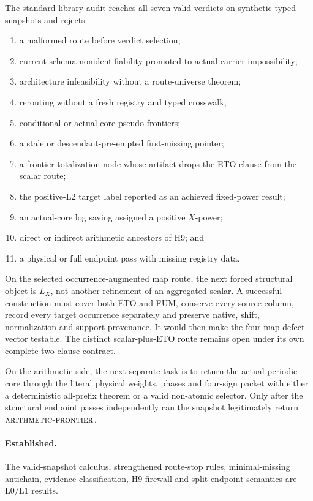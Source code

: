 \documentclass[11pt]{article}
\theoremstyle{definition}
\theoremstyle{remark}
\newcommand{\Lzero}{\mathrm{L0}}
\newcommand{\Lone}{\mathrm{L1}}
\newcommand{\Ltwo}{\mathrm{L2}}
\newcommand{\AF}{\textnormal{\textsc{arithmetic-frontier}}}
\begin{document}
The standard-library audit reaches all seven valid verdicts on
synthetic typed snapshots and rejects:
\begin{enumerate}[leftmargin=2em]
\item a malformed route before verdict selection;
\item current-schema nonidentifiability promoted to actual-carrier
  impossibility;
\item architecture infeasibility without a route-universe theorem;
\item rerouting without a fresh registry and typed crosswalk;
\item conditional or actual-core pseudo-frontiers;
\item a stale or descendant-pre-empted first-missing pointer;
\item a frontier-totalization node whose artifact drops the ETO
  clause from the scalar route;
\item the positive-\(\Ltwo\) target label reported as an achieved
  fixed-power result;
\item an actual-core log saving assigned a positive \(X\)-power;
\item direct or indirect arithmetic ancestors of H9; and
\item a physical or full endpoint pass with missing registry data.
\end{enumerate}

On the selected occurrence-augmented map route, the next forced
structural object is \(L_X\), not another refinement of an aggregated
scalar.  A successful construction must cover both ETO and FUM,
conserve every source column, record every target occurrence
separately and preserve native, shift, normalization and support
provenance.  It would then make the four-map defect vector testable.
The distinct scalar-plus-ETO route remains open under its own complete
two-clause contract.

On the arithmetic side, the next separate task is to return the actual
periodic core through the literal physical weights, phases and
four-sign packet with either a deterministic all-prefix theorem or a
valid non-atomic selector.  Only after the structural endpoint passes
independently can the snapshot legitimately return \(\AF\).

\paragraph{Established.}
The valid-snapshot calculus, strengthened route-stop rules,
minimal-missing antichain, evidence classification, H9 firewall and
split endpoint semantics are \(\Lzero/\Lone\) results.
\end{document}
